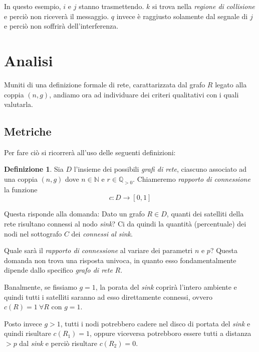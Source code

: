 \documentclass[a4paper,12pt]{article}
\theoremstyle{definition}
\newtheorem{definition}{Definizione}
\begin{document}
In questo esempio, $i$ e $j$ stanno trasmettendo. $k$ si trova nella \emph{regione di collisione} e perciò non riceverà il messaggio. $q$ invece è raggiusto solamente dal segnale di $j$ e perciò non soffrirà dell'interferenza.


\section{Analisi}

Muniti di una definizione formale di rete, carattarizzata dal grafo $R$ legato alla coppia $(n, g)$, andiamo ora ad individuare dei criteri qualitativi con i quali valutarla.

\subsection{Metriche}

Per fare ciò si ricorrerà all'uso delle seguenti definizioni:

\begin{definition}
Sia $D$ l'insieme dei possibili \emph{grafi di rete}, ciascuno associato ad una coppia $(n, g)$ dove $n \in \mathbb{N}$ e $r \in \mathbb{Q}_{>0}$. Chiameremo \emph{rapporto di connessione} la funzione
\begin{equation*}
c \colon D \to [0, 1]
\end{equation*}
\end{definition}

Questa risponde alla domanda: Dato un grafo $R \in D$, quanti dei satelliti della rete risultano connessi al nodo \emph{sink}? Ci da quindi la quantità (percentuale) dei nodi nel sottografo $C$ dei \emph{connessi al sink}.

Quale sarà il \emph{rapporto di connessione} al variare dei parametri $n$ e $p$? Questa domanda non trova una risposta univoca, in quanto esso fondamentalmente dipende dallo specifico \emph{grafo di rete} $R$.

Banalmente, se fissiamo $g = 1$, la porata del \emph{sink} coprirà l'intero ambiente e quindi tutti i satelliti saranno ad esso direttamente connessi, ovvero $c(R) = 1 \ \forall R$ con $g = 1$.

Posto invece $g > 1$, tutti i nodi potrebbero cadere nel disco di portata del \emph{sink} e quindi risultare $c(R_1) = 1$, oppure viceversa potrebboro essere tutti a distanza $> p$ dal \emph{sink} e perciò risultare $c(R_2) = 0$.
\end{document}

